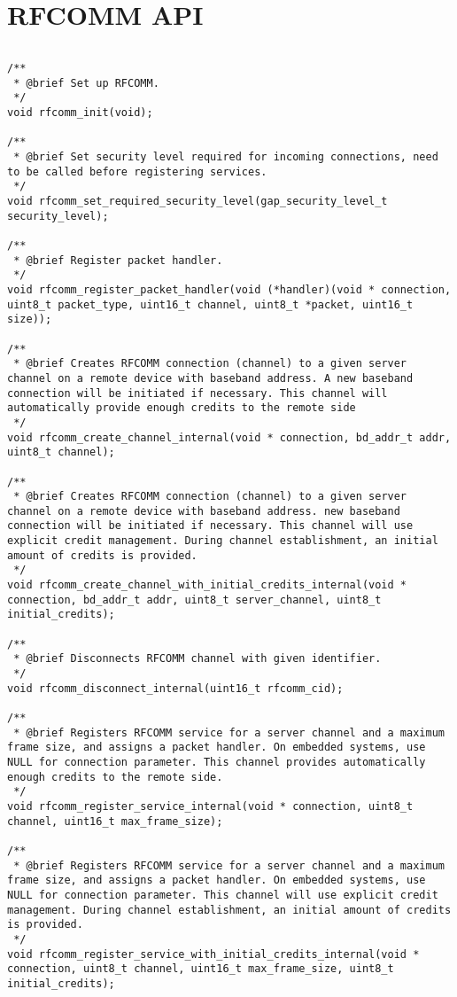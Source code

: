 \section{RFCOMM API}
\label{appendix:api_rfcomm}
$ $
\begin{lstlisting}
/** 
 * @brief Set up RFCOMM.
 */
void rfcomm_init(void);

/** 
 * @brief Set security level required for incoming connections, need to be called before registering services.
 */
void rfcomm_set_required_security_level(gap_security_level_t security_level);

/** 
 * @brief Register packet handler.
 */
void rfcomm_register_packet_handler(void (*handler)(void * connection, uint8_t packet_type, uint16_t channel, uint8_t *packet, uint16_t size));

/** 
 * @brief Creates RFCOMM connection (channel) to a given server channel on a remote device with baseband address. A new baseband connection will be initiated if necessary. This channel will automatically provide enough credits to the remote side
 */
void rfcomm_create_channel_internal(void * connection, bd_addr_t addr, uint8_t channel);

/** 
 * @brief Creates RFCOMM connection (channel) to a given server channel on a remote device with baseband address. new baseband connection will be initiated if necessary. This channel will use explicit credit management. During channel establishment, an initial  amount of credits is provided.
 */
void rfcomm_create_channel_with_initial_credits_internal(void * connection, bd_addr_t addr, uint8_t server_channel, uint8_t initial_credits);

/** 
 * @brief Disconnects RFCOMM channel with given identifier. 
 */
void rfcomm_disconnect_internal(uint16_t rfcomm_cid);

/** 
 * @brief Registers RFCOMM service for a server channel and a maximum frame size, and assigns a packet handler. On embedded systems, use NULL for connection parameter. This channel provides automatically enough credits to the remote side.
 */
void rfcomm_register_service_internal(void * connection, uint8_t channel, uint16_t max_frame_size);

/** 
 * @brief Registers RFCOMM service for a server channel and a maximum frame size, and assigns a packet handler. On embedded systems, use NULL for connection parameter. This channel will use explicit credit management. During channel establishment, an initial amount of credits is provided.
 */
void rfcomm_register_service_with_initial_credits_internal(void * connection, uint8_t channel, uint16_t max_frame_size, uint8_t initial_credits);


\end{lstlisting}
